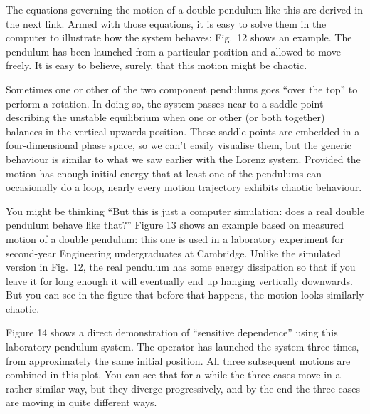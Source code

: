   The equations governing the motion of a double pendulum like this are derived 
  in the next link. Armed with those equations, it is easy to solve them in the 
  computer to illustrate how the system behaves: Fig.\ 12 shows an example. The 
  pendulum has been launched from a particular position and allowed to move 
  freely. It is easy to believe, surely, that this motion might be chaotic. 

  Sometimes one or other of the two component pendulums goes ``over the top'' 
  to perform a rotation. In doing so, the system passes near to a saddle point 
  describing the unstable equilibrium when one or other (or both together) 
  balances in the vertical-upwards position. These saddle points are embedded 
  in a four-dimensional phase space, so we can't easily visualise them, but the 
  generic behaviour is similar to what we saw earlier with the Lorenz system. 
  Provided the motion has enough initial energy that at least one of the 
  pendulums can occasionally do a loop, nearly every motion trajectory exhibits 
  chaotic behaviour. 

  You might be thinking ``But this is just a computer simulation: does a real 
  double pendulum behave like that?'' Figure 13 shows an example based on 
  measured motion of a double pendulum: this one is used in a laboratory 
  experiment for second-year Engineering undergraduates at Cambridge. Unlike 
  the simulated version in Fig.\ 12, the real pendulum has some energy 
  dissipation so that if you leave it for long enough it will eventually end up 
  hanging vertically downwards. But you can see in the figure that before that 
  happens, the motion looks similarly chaotic. 

  Figure 14 shows a direct demonstration of ``sensitive dependence'' using this 
  laboratory pendulum system. The operator has launched the system three times, 
  from approximately the same initial position. All three subsequent motions 
  are combined in this plot. You can see that for a while the three cases move 
  in a rather similar way, but they diverge progressively, and by the end the 
  three cases are moving in quite different ways. 

